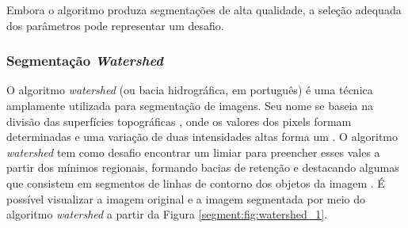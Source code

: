 Embora o algoritmo produza segmentações de alta qualidade, a seleção adequada dos parâmetros pode representar um desafio.

\subsubsection{Segmentação \textit{Watershed}}
\label{segment:watershed}
O algoritmo \textit{watershed} (ou bacia hidrográfica, em português) é uma técnica amplamente utilizada para segmentação de imagens. Seu nome se baseia na divisão das superfícies topográficas \citep{pedrini2008analise}, onde os valores dos pixels formam determinadas  e uma variação de duas intensidades altas forma um . O algoritmo \textit{watershed} tem como desafio encontrar um limiar para preencher esses vales a partir dos mínimos regionais, formando bacias de retenção e destacando algumas  que consistem em segmentos de linhas de contorno dos objetos da imagem \citep{pedrini2008analise, SealWatershed:Approach}. É possível visualizar a imagem original e a imagem segmentada por meio do algoritmo \textit{watershed} a partir da Figura \ref{segment:fig:watershed_1}.

